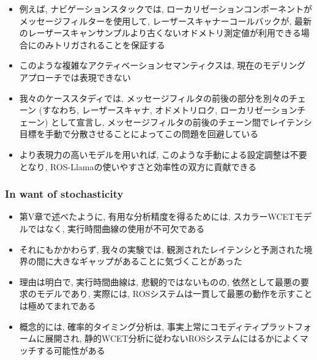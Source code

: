 \begin{frame}{}
    \begin{itemize}
        \item 例えば, ナビゲーションスタックでは, ローカリゼーションコンポーネントがメッセージフィルターを使用して, レーザースキャナーコールバックが, 最新のレーザースキャンサンプルより古くないオドメトリ測定値が利用できる場合にのみトリガされることを保証する
        \item このような複雑なアクティベーションセマンティクスは, 現在のモデリングアプローチでは表現できない
        \item 我々のケーススタディでは, メッセージフィルタの前後の部分を別々のチェーン (すなわち, レーザースキャナ, オドメトリロク, ローカリゼーションチェーン) として宣言し, メッセージフィルタの前後のチェーン間でレイテンシ目標を手動で分散させることによってこの問題を回避している
        \item より表現力の高いモデルを用いれば, このような手動による設定調整は不要となり, ROS-Llamaの使いやすさと効率性の双方に貢献できる
    \end{itemize}
\end{frame}


\subsubsection{In want of stochasticity}
\label{sssec: in want of stochasticity}

\begin{frame}{}
    \begin{itemize}
        \item 第V章で述べたように, 有用な分析精度を得るためには, スカラーWCETモデルではなく, 実行時間曲線の使用が不可欠である
        \item それにもかかわらず, 我々の実験では, 観測されたレイテンシと予測された境界の間に大きなギャップがあることに気づくことがあった
    \end{itemize}
\end{frame}

\begin{frame}{}
    \begin{itemize}
        \item 理由は明白で, 実行時間曲線は, 悲観的ではないものの, 依然として最悪の要求のモデルであり, 実際には, ROSシステムは一貫して最悪の動作を示すことは極めてまれである
        \item 概念的には, 確率的タイミング分析は, 事実上常にコモディティプラットフォームに展開され, 静的WCET分析に従わないROSシステムにはるかによくマッチする可能性がある
    \end{itemize}
\end{frame}

